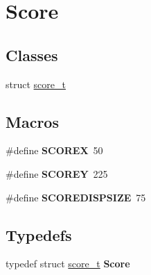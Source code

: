 \hypertarget{group__Score}{}\section{Score}
\label{group__Score}
\subsection*{Classes}
\begin{DoxyCompactItemize}
\item 
struct \hyperlink{structscore__t}{score\+\_\+t}
\end{DoxyCompactItemize}
\subsection*{Macros}
\begin{DoxyCompactItemize}
\item 
\mbox{\label{group__Score_ga57c93e55ae32cef3c1d7da972f446c15}} 
\#define {\bfseries S\+C\+O\+R\+EX}~50
\item 
\mbox{\label{group__Score_ga764e20bfc42e76a92e241ae8f2c07299}} 
\#define {\bfseries S\+C\+O\+R\+EY}~225
\item 
\mbox{\label{group__Score_ga3ed6a846337c7da396f1ead0e4f9a04f}} 
\#define {\bfseries S\+C\+O\+R\+E\+D\+I\+S\+P\+S\+I\+ZE}~75
\end{DoxyCompactItemize}
\subsection*{Typedefs}
\begin{DoxyCompactItemize}
\item 
\mbox{\label{group__Score_ga8822ff9f9c86274938199a743325ec36}} 
typedef struct \hyperlink{structscore__t}{score\+\_\+t} {\bfseries Score}
\end{DoxyCompactItemize}
